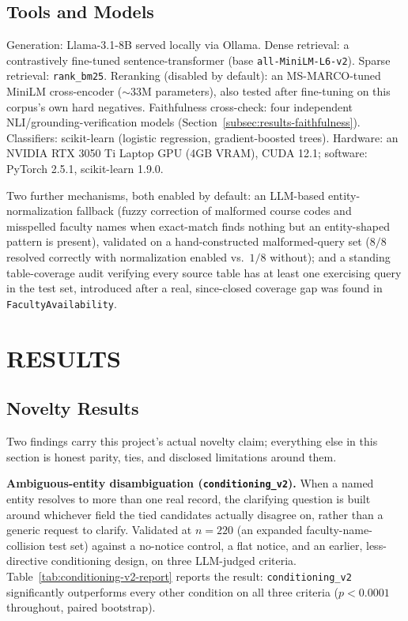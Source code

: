 \documentclass[a4paper,twoside]{article}
\begin{document}
\subsection{Tools and Models}
\label{subsec:tools}

Generation: Llama-3.1-8B served locally via Ollama. Dense retrieval: a contrastively fine-tuned sentence-transformer (base \texttt{all-MiniLM-L6-v2}). Sparse retrieval: \texttt{rank\_bm25}. Reranking (disabled by default): an MS-MARCO-tuned MiniLM cross-encoder ($\sim$33M parameters), also tested after fine-tuning on this corpus's own hard negatives. Faithfulness cross-check: four independent NLI/grounding-verification models (Section~\ref{subsec:results-faithfulness}). Classifiers: scikit-learn (logistic regression, gradient-boosted trees). Hardware: an NVIDIA RTX 3050 Ti Laptop GPU (4GB VRAM), CUDA 12.1; software: PyTorch 2.5.1, scikit-learn 1.9.0.

Two further mechanisms, both enabled by default: an LLM-based entity-normalization fallback (fuzzy correction of malformed course codes and misspelled faculty names when exact-match finds nothing but an entity-shaped pattern is present), validated on a hand-constructed malformed-query set ($8/8$ resolved correctly with normalization enabled vs.\ $1/8$ without); and a standing table-coverage audit verifying every source table has at least one exercising query in the test set, introduced after a real, since-closed coverage gap was found in \texttt{FacultyAvailability}.

\section{\uppercase{Results}}
\label{sec:results}

\subsection{Novelty Results}
\label{subsec:results-novelty}

Two findings carry this project's actual novelty claim; everything else in this section is honest parity, ties, and disclosed limitations around them.

\textbf{Ambiguous-entity disambiguation (\texttt{conditioning\_v2}).} When a named entity resolves to more than one real record, the clarifying question is built around whichever field the tied candidates actually disagree on, rather than a generic request to clarify. Validated at $n=220$ (an expanded faculty-name-collision test set) against a no-notice control, a flat notice, and an earlier, less-directive conditioning design, on three LLM-judged criteria. Table~\ref{tab:conditioning-v2-report} reports the result: \texttt{conditioning\_v2} significantly outperforms every other condition on all three criteria ($p<0.0001$ throughout, paired bootstrap).
\end{document}
